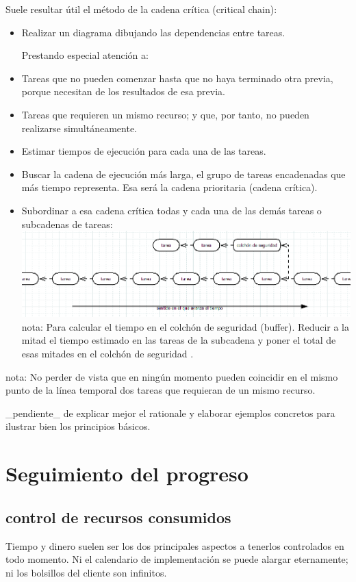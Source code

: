 \documentclass[spanish,12pt,a4paper,final,oneside]{book}
\begin{document}
Suele resultar útil el método de la cadena crítica (critical chain):
\begin{itemize}
\item Realizar un diagrama dibujando las dependencias entre tareas. 

Prestando especial atención a:
\item Tareas que no pueden comenzar hasta que no haya terminado otra previa, porque necesitan de los resultados de esa previa.
\item Tareas que requieren un mismo recurso; y que, por tanto, no pueden realizarse simultáneamente.

\item Estimar tiempos de ejecución para cada una de las tareas.
\item Buscar la cadena de ejecución más larga, el grupo de tareas encadenadas que más tiempo representa. Esa será la cadena prioritaria (cadena crítica). 
\item Subordinar a esa cadena crítica todas y cada una de las demás tareas o subcadenas de tareas:
\\
\includegraphics[width=\textwidth]{subordinacion de tareas a la cadena critica}
nota: Para calcular el tiempo en el colchón de seguridad (buffer). Reducir a la mitad el tiempo estimado en las tareas de la subcadena y poner el total de esas mitades en el colchón de seguridad .
\end{itemize}

nota: No perder de vista que en ningún momento pueden coincidir en el mismo punto de la línea temporal dos tareas que requieran de un mismo recurso.

\_pendiente\_ de explicar mejor el rationale y elaborar ejemplos concretos para ilustrar bien los principios básicos.

\section{Seguimiento del progreso}
\subsection{control de recursos consumidos}
Tiempo y dinero suelen ser los dos principales aspectos a tenerlos controlados en todo momento. Ni el calendario de implementación se puede alargar eternamente; ni los bolsillos del cliente son infinitos.
\end{document}
